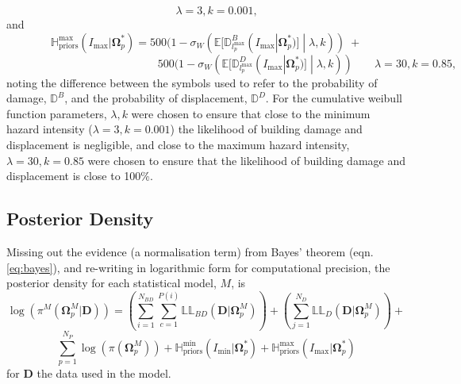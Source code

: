 \documentclass[10pt,a4paper]{article}
\begin{document}
\begin{multicols}{1}
\begin{equation}
  \;\;\;\;\;\;\; \lambda=3,k=0.001,
\end{equation}
and
\begin{equation}
  \mathbb{H}_{\text{priors}}^{\max}(I_{\max}|\boldsymbol{\Omega}^*_p)=500(1-\sigma_W(\mathbb{E}[\mathbb{D}^B_{l_p^{\max}}(I_{\max}|\boldsymbol{\Omega}^*_p)]\;|\;\lambda,k))\;+
  \end{equation}
\begin{equation}
\;\;\;\;\;\;\;\;\;\;\;\;\;\;\;\;\;\;\;\;\;\;\;\;\;\;\;\;\;\;\;\;\;\;\;\;\;\;\;\;\;\;\;\;\;\;\;\;\;500(1-\sigma_W(\mathbb{E}[\mathbb{D}^D_{l_p^{\max}}(I_{\max}|\boldsymbol{\Omega}^*_p)]\;|\;\lambda,k))
  \;\;\;\;\;\;\; \lambda=30,k=0.85,
\end{equation}
noting the difference between the symbols used to refer to the probability of damage, $\mathbb{D}^B$, and the probability of displacement, $\mathbb{D}^D$. For the cumulative weibull function parameters, $\lambda,k$ were chosen to ensure that close to the minimum hazard intensity ($\lambda=3,k=0.001$) the likelihood of building damage and displacement is negligible, and close to the maximum hazard intensity, $\lambda=30,k=0.85$ were chosen to ensure that the likelihood of building damage and displacement is close to 100\%. 
\subsection{Posterior Density}\label{sec:posterior}
Missing out the evidence (a normalisation term) from Bayes' theorem (eqn. \ref{eq:bayes}), and re-writing in logarithmic form for computational precision, the posterior density for each statistical model, $M$, is
\begin{equation}
  \log\left(\pi^{M}(\boldsymbol{\Omega}_p^M|\boldsymbol{D})\right)=\left(\sum_{i=1}^{N_{BD}}\sum_{c=1}^{P(i)}\mathbb{LL}_{BD}(\boldsymbol{D}|\boldsymbol{\Omega}^M_p)\right) + \left(\sum_{j=1}^{N_D}\mathbb{LL}_D(\boldsymbol{D}|\boldsymbol{\Omega}^M_p)\right)+
\end{equation}
\begin{equation}\label{eqn:posterior}
  \sum_{p=1}^{N_P}\log\left(\pi(\boldsymbol{\Omega}_p^M)\right) + \mathbb{H}_{\text{priors}}^{\min}(I_{\min}|\boldsymbol{\Omega}^*_p) + \mathbb{H}_{\text{priors}}^{\max}(I_{\max}|\boldsymbol{\Omega}^*_p)
\end{equation}
for $\boldsymbol{D}$ the data used in the model.

\end{multicols}
\end{document}
